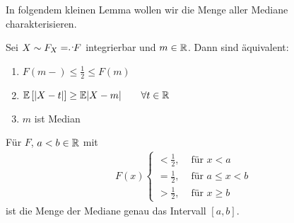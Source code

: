 In folgendem kleinen Lemma wollen wir die Menge aller Mediane charakterisieren.
\setcounter{thmcount}{-1}
\begin{lemma}\label{lemma: median}
	Sei $X \sim F_X \defqe F$ integrierbar und $m \in \mathbb{R}$. Dann sind äquivalent:
	\begin{enumerate}[label=(\arabic*)]
		\item \label{it:medianHalf} $F(m-)\le \frac{1}{2} \le F(m)$
		\item \label{it:medianMin} $\mathbb{E}\left[ \left| X-t \right| \right]\ge\mathbb{E}{\left| X-m \right|} \qquad\forall t \in \mathbb{R}$
		\item \label{it:medianMedian} $m$ ist Median
	\end{enumerate}
\end{lemma}
\begin{beispiel}
	Für $F$, $a < b \in \mathbb{R}$ mit
	\begin{align*}
		F(x) \begin{cases}
			< \frac12, &\text{ für } x < a \\
			= \frac12, &\text{ für } a \le x < b \\
			> \frac12, &\text{ für } x \ge b
		\end{cases}
	\end{align*}
	ist die Menge der Mediane genau das Intervall $[a, b]$.
\end{beispiel}

